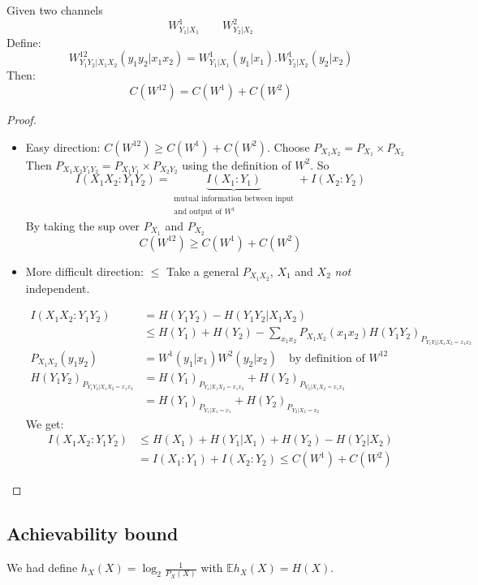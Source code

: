 \begin{thm}
Given two channels
\[W_{Y_1|X_1}^1 \qquad W_{Y_2|X_2}^2\]
Define:
\[W_{Y_1Y_2|X_1X_2}^{12}(y_1y_2|x_1x_2)=W_{Y_1|X_1}^1(y_1|x_1) . W_{Y_2|X_2}^1(y_2|x_2)\]
Then:
\[C(W^{12})=C(W^1)+C(W^2)\]
\end{thm}
\begin{proof}
\begin{itemize}
\item Easy direction: $C(W^{12})\geq C(W^1)+C(W^2)$.
Choose $P_{X_1X_2}=P_{X_1}\times P_{X_2}$\\
Then $P_{X_1X_2Y_1Y_2}=P_{X_1Y_1}\times P_{X_2Y_2}$ using the definition of $W^2$.
So 
\[I(X_1X_2:Y_1Y_2) = \underbrace{I(X_1:Y_1)}_{\substack{\text{mutual information between input}\\\text{and output of $W^1$}}} + I(X_2:Y_2)\]
By taking the sup over $P_{X_1}$ and $P_{X_2}$
\[C(W^{12})\geq C(W^1)+C(W^2)\]

\item More difficult direction: $\leq$
Take a general $P_{X_1X_2}$, $X_1$ and $X_2$ \emph{not} independent.

\begin{align*}
I(X_1X_2:Y_1Y_2) & = H(Y_1Y_2)-H(Y_1Y_2|X_1X_2) \\
& \leq H(Y_1)+H(Y_2)-\sum_{x_1x_2}P_{X_1X_2}(x_1x_2)H(Y_1Y_2)_{P_{Y_1Y_2|X_1X_2=x_1x_2}} \\
P_{X_1X_2}(y_1y_2) & = W^1(y_1|x_1)W^2(y_2|x_2) \quad \text{by definition of }W^{12} \\
H(Y_1Y_2)_{P_{Y_1Y_2|X_1X_2=x_1x_2}} & = H(Y_1)_{P_{Y_1|X_1X_2=x_1x_2}} + H(Y_2)_{P_{Y_2|X_1X_2=x_1x_2}} \\
& = H(Y_1)_{P_{Y_1|X_1=x_1}}+  H(Y_2)_{P_{Y_2|X_2=x_2}}
\end{align*}
We get:
\begin{align*}
I(X_1X_2:Y_1Y_2) & \leq H(X_1) + H(Y_1|X_1)+H(Y_2) - H(Y_2|X_2)\\
& = I(X_1:Y_1)+I(X_2:Y_2)\leq C(W^1)+C(W^2)
\end{align*}


\end{itemize}
\end{proof}

\subsection{Achievability bound}
We had define $h_X(X)=\log_2 \frac{1}{P_X(X)}$ with $\mathbb{E}h_X(X)=H(X)$.

